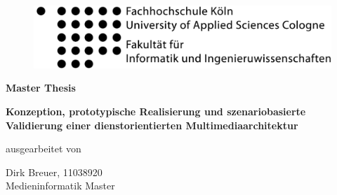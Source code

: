 
\begin{titlepage}

\begin{center}

\begin{figure}[!ht]
	\flushleft
		\includegraphics[natwidth=920pt, natheight=95pt, width=.5\textwidth]{images/fh_logo.pdf}
\end{figure}

\vspace{0.5cm}

\begin{large}
\begin{scshape}
\textbf{Master Thesis}\\[0.8em]
\end{scshape}
\end{large}

\begin{rmfamily}
  \LARGE
  \textbf{
  Konzeption, prototypische Realisierung und szenariobasierte Validierung einer dienstorientierten Multimediaarchitektur
  }\\
\normalsize
\end{rmfamily}

\vspace{0.5cm}

% 

\begin{large}
ausgearbeitet von\\ 
\vspace{0.2cm}
\begin{Large}
Dirk Breuer, 11038920\\Medieninformatik Master\\
\end{Large}
\end{large}


\end{center}
\end{titlepage}
